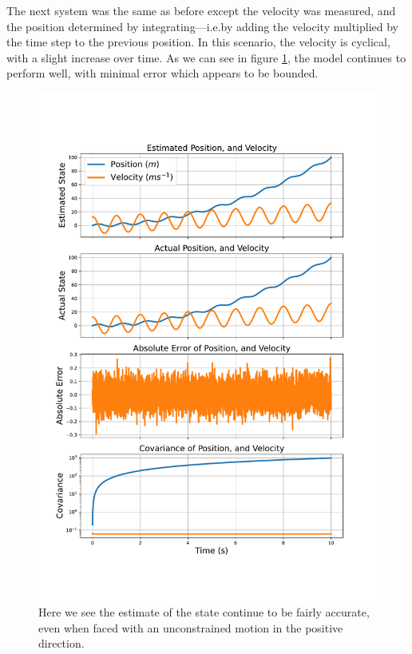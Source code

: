 \documentclass[12pt]{article}
\begin{document}
The next system was the same as before except the velocity was measured, and the position determined by integrating---i.e.\@ by adding the velocity multiplied by the time step to the previous position. In this scenario, the velocity is cyclical, with a slight increase over time. As we can see in figure \ref{1d_velocity_fig}, the model continues to perform well, with minimal error which appears to be bounded.

\begin{figure}[thp]
	\centering
	
	\includegraphics[height=0.8\textheight]{1d-velocity.pdf}
	
	\caption{Here we see the estimate of the state continue to be fairly accurate, even when faced with an unconstrained motion in the positive direction.}
	\label{1d_velocity_fig}
\end{figure}
\end{document}
